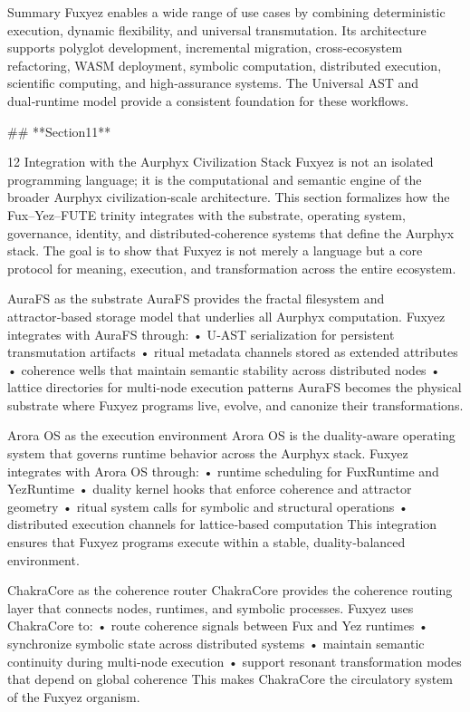 Summary
Fuxyez enables a wide range of use cases by combining deterministic execution, dynamic flexibility, and universal transmutation. Its architecture supports polyglot development, incremental migration, cross‑ecosystem refactoring, WASM deployment, symbolic computation, distributed execution, scientific computing, and high‑assurance systems. The Universal AST and dual‑runtime model provide a consistent foundation for these workflows.

## **Section11**

12 Integration with the Aurphyx Civilization Stack
Fuxyez is not an isolated programming language; it is the computational and semantic engine of the broader Aurphyx civilization‑scale architecture. This section formalizes how the Fux–Yez–FUTE trinity integrates with the substrate, operating system, governance, identity, and distributed‑coherence systems that define the Aurphyx stack. The goal is to show that Fuxyez is not merely a language but a core protocol for meaning, execution, and transformation across the entire ecosystem.

AuraFS as the substrate
AuraFS provides the fractal filesystem and attractor‑based storage model that underlies all Aurphyx computation. Fuxyez integrates with AuraFS through:
• 	U‑AST serialization for persistent transmutation artifacts
• 	ritual metadata channels stored as extended attributes
• 	coherence wells that maintain semantic stability across distributed nodes
• 	lattice directories for multi‑node execution patterns
AuraFS becomes the physical substrate where Fuxyez programs live, evolve, and canonize their transformations.

Arora OS as the execution environment
Arora OS is the duality‑aware operating system that governs runtime behavior across the Aurphyx stack. Fuxyez integrates with Arora OS through:
• 	runtime scheduling for FuxRuntime and YezRuntime
• 	duality kernel hooks that enforce coherence and attractor geometry
• 	ritual system calls for symbolic and structural operations
• 	distributed execution channels for lattice‑based computation
This integration ensures that Fuxyez programs execute within a stable, duality‑balanced environment.

ChakraCore as the coherence router
ChakraCore provides the coherence routing layer that connects nodes, runtimes, and symbolic processes. Fuxyez uses ChakraCore to:
• 	route coherence signals between Fux and Yez runtimes
• 	synchronize symbolic state across distributed systems
• 	maintain semantic continuity during multi‑node execution
• 	support resonant transformation modes that depend on global coherence
This makes ChakraCore the circulatory system of the Fuxyez organism.

